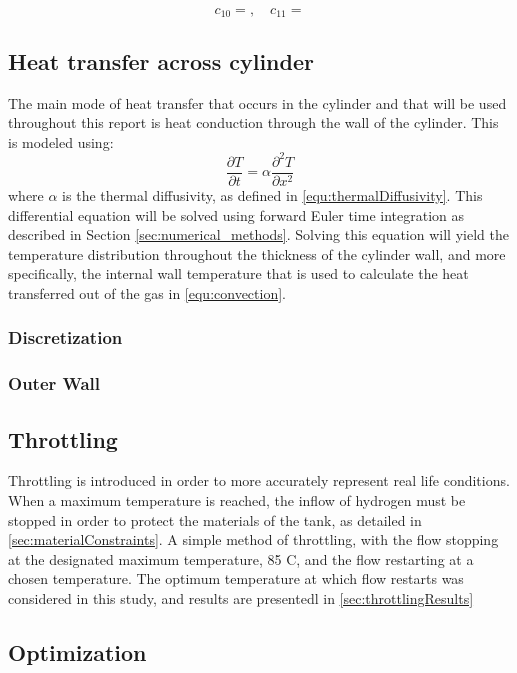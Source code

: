 \begin{equation}
c_{10} =   ,  \quad c_{11} = 
\end{equation}





\subsection{Heat transfer across cylinder}

The main mode of heat transfer that occurs in the cylinder and that will be used throughout this report is heat conduction through the wall of the cylinder. This is modeled using:
\begin{equation}
\frac{\partial T}{\partial t} = \alpha \frac{\partial^2 T }{\partial x^2}
\end{equation}
where $\alpha$ is the thermal diffusivity, as defined in \cref{equ:thermalDiffusivity}. This differential equation will be solved using forward Euler time integration as described in Section \ref{sec:numerical_methods}. Solving this equation will yield the temperature distribution throughout the thickness of the cylinder wall, and more specifically, the internal wall temperature that is used to calculate the heat transferred out of the gas in \cref{equ:convection}.


\subsubsection{Discretization}


\subsubsection{Outer Wall}




\subsection{Throttling}

Throttling is introduced in order to more accurately represent real life conditions. When a maximum temperature is reached, the inflow of hydrogen must be stopped in order to protect the materials of the tank, as detailed in \cref{sec:materialConstraints}. A simple method of throttling, with the flow stopping at the designated maximum temperature, 85 \degree C, and the flow restarting at a chosen temperature. The optimum temperature at which flow restarts was considered in this study, and results are presentedl in \cref{sec:throttlingResults}


\subsection{Optimization}


